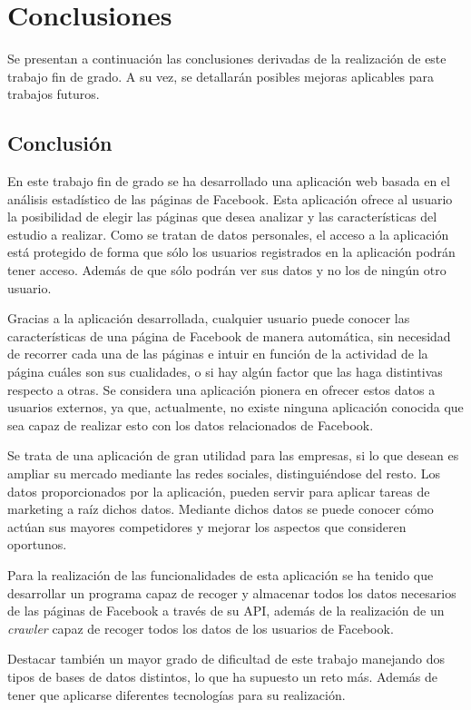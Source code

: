 \chapter{Conclusiones}

Se presentan a continuación las conclusiones derivadas de la realización de este trabajo fin de grado. A su vez, se detallarán posibles mejoras aplicables para trabajos futuros.

\section{Conclusión}

En este trabajo fin de grado se ha desarrollado una aplicación web basada en el análisis estadístico de las páginas de Facebook. Esta aplicación ofrece al usuario la posibilidad de elegir las páginas que desea analizar y las características del estudio a realizar. Como se tratan de datos personales, el acceso a la aplicación está protegido de forma que sólo los usuarios registrados en la aplicación podrán tener acceso. Además de que sólo podrán ver sus datos y no los de ningún otro usuario. 

Gracias a la aplicación desarrollada, cualquier usuario puede conocer las características de una página de Facebook de manera automática, sin necesidad de recorrer cada una de las páginas e intuir en función de la actividad de la página cuáles son sus cualidades, o si hay algún factor que las haga distintivas respecto a otras. Se considera una aplicación pionera en ofrecer estos datos a usuarios externos, ya que, actualmente, no existe ninguna aplicación conocida que sea capaz de realizar esto con los datos relacionados de Facebook. 

Se trata de una aplicación de gran utilidad para las empresas, si lo que desean es ampliar su mercado mediante las redes sociales, distinguiéndose del resto.
Los datos proporcionados por la aplicación, pueden servir para aplicar tareas de marketing a raíz dichos datos. Mediante dichos datos se puede conocer cómo actúan sus mayores competidores y mejorar los aspectos que consideren oportunos.

Para la realización de las funcionalidades de esta aplicación se ha tenido que desarrollar un programa capaz de recoger y almacenar todos los datos necesarios de las páginas de Facebook a través de su API, además de la realización de un \textit{crawler} capaz de recoger todos los datos de los usuarios de Facebook.

Destacar también un mayor grado de dificultad de este trabajo manejando dos tipos de bases de datos distintos, lo que ha supuesto un reto más. Además de tener que aplicarse diferentes tecnologías para su realización.

